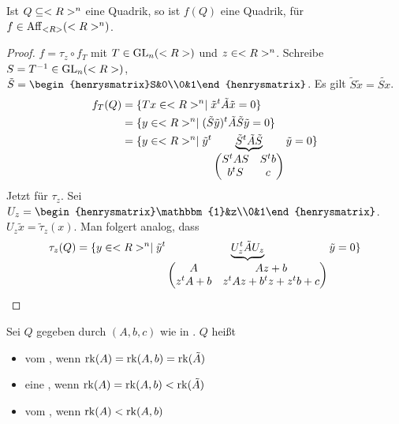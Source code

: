 \begin{lemma}
	Ist $Q\subseteq<R>^n$ eine Quadrik, so ist $f(Q)$ eine Quadrik, für $f\in\operatorname{Aff}_{<R>}(<R>^n)$.
\end{lemma}
\begin{proof}
	$f=\tau_z\circ f_T$ mit $T\in\operatorname{GL}_n(<R>)$ und $z\in<R>^n$. Schreibe $S=T^{-1}\in\operatorname{GL}_n(<R>)$, $\tilde{S}=\begin{henrysmatrix}S&0\\0&1\end{henrysmatrix}$. Es gilt $\tilde{S}\tilde{x}=\widetilde{Sx}$.
	\begin{align}
		f_T(Q)&=\{Tx\in<R>^n\mid \tilde{x}^t\tilde{A}\tilde{x}=0\}\notag \\
		&=\{y\in<R>^n\mid (\tilde{S}\tilde{y})^t\tilde{A}\tilde{S}\tilde{y}=0\}\notag \\
		&=\{y\in<R>^n\mid \tilde{y}^t\underbrace{\tilde{S}^t\tilde{A}\tilde{S}}_{\begin{pmatrix}S^tAS&S^tb\\b^tS&c\end{pmatrix}}\tilde{y}=0\}\notag
	\end{align}
	Jetzt für $\tau_z$. Sei $U_z=\begin{henrysmatrix}\mathbbm{1}&z\\0&1\end{henrysmatrix}$. $U_z\tilde{x}=\tilde{\tau}_z(x)$. Man folgert analog, dass 
	\begin{align}
		\tau_z(Q)=\{y\in<R>^n\mid \tilde{y}^t\underbrace{U_z^t\tilde{A}U_z}_{\begin{pmatrix} A&Az+b\\z^tA+b&z^tAz+b^tz+z^tb+c\end{pmatrix}}\tilde{y}=0\}\notag
	\end{align}
\end{proof}

\begin{definition}
	Sei $Q$ gegeben durch $(A,b,c)$ wie in . $Q$ heißt
	\begin{itemize}
		\item vom , wenn $\operatorname{rk}(A)=\operatorname{rk}(A,b)=\operatorname{rk}(\tilde{A})$
		\item eine , wenn $\operatorname{rk}(A)=\operatorname{rk}(A,b)<\operatorname{rk}(\tilde{A})$
		\item vom , wenn $\operatorname{rk}(A)<\operatorname{rk}(A,b)$
	\end{itemize}
\end{definition}

